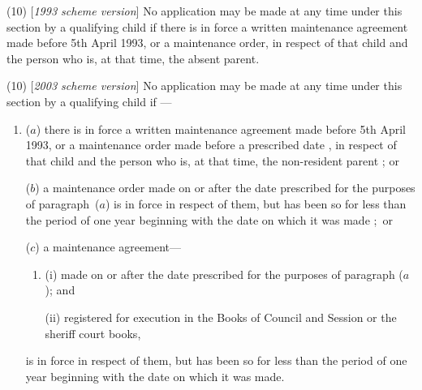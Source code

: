 \documentclass[12pt,a4paper]{article}
\begin{document}
(10) [\emph{1993 scheme version}] No application may be made at any time under this section by a qualifying child if there is in force a written maintenance agreement made before 5th April 1993, or a maintenance order, in respect of that child and the person who is, at that time, the absent parent.

(10) [\emph{2003 scheme version}] No application may be made at any time under this section by a qualifying child if%
---
\begin{enumerate}\item[]
($a$) %
 there is in force a written maintenance agreement made before 5th April 1993, or a maintenance order
made before a prescribed date%
, in respect of that child and the person who is, at that time, the 
non-resident parent%
; or

($b$) a maintenance order made on or after the date prescribed for the purposes of paragraph~($a$)  is in force in respect of them, but has been so for less than the period of one year beginning with the date on which it was made%
;~or 

($c$) a maintenance agreement—
\begin{enumerate}\item[]
(i) made on or after the date prescribed for the purposes of paragraph ($a$); and

(ii) registered for execution in the Books of Council and Session or the sheriff court books,
\end{enumerate}
is in force in respect of them, but has been so for less than the period of one year beginning with the date on which it was made.
\end{enumerate}

\end{document}
